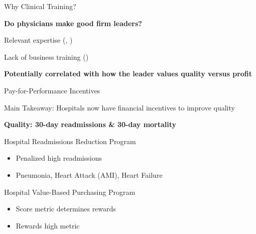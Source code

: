 \documentclass[notes,11pt, aspectratio=169]{beamer}
\newenvironment{wideitemize}{\itemize\addtolength{\itemsep}{10pt}}{\enditemize}
\begin{document}
\begin{frame}{Why Clinical Training?}

\large

\textbf{Do physicians make good firm leaders?}

\vspace{2mm}

\begin{wideitemize}
    \item Relevant expertise \scriptsize (\cite{Stajduhar_2023}, \cite{Ahmed_2022}) \large

    
    \item Lack of business training \scriptsize (\cite{HarvardBusinessReview2018})
\end{wideitemize}

\vspace{12mm}

\textbf{Potentially correlated with how the leader values quality versus profit}
\end{frame}

\begin{frame}{Pay-for-Performance Incentives}
    \large
    \begin{block}{\Large Main Takeaway:}
        \large 
        \centering
        \vspace{1mm}
        Hospitals now have financial incentives to improve quality

        \vspace{1mm}
    \end{block}

    \vspace{6mm}
    
    \textbf{Quality: 30-day readmissions \& 30-day mortality}

    \vspace{5mm}

    Hospital Readmissions Reduction Program
    \begin{itemize}
        \item Penalized high readmissions
        \item Pneumonia, Heart Attack (AMI), Heart Failure
    \end{itemize}

    \vspace{5mm}

    Hospital Value-Based Purchasing Program
    \begin{itemize}
        \item Score metric determines rewards
        \item Rewards high metric
    \end{itemize}
\end{frame}
\end{document}

